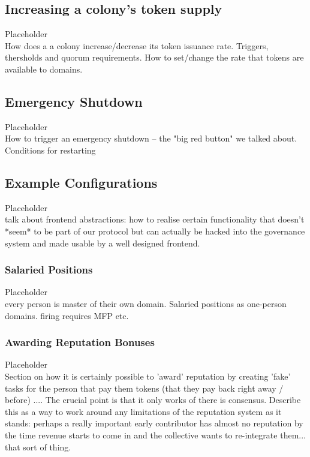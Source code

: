  
\subsection{Increasing a colony's token supply}\label{sec:colony-token-managements}

%
Placeholder\\
How does a a colony increase/decrease its token issuance rate. Triggers, thersholds and quorum requirements.
How to set/change the rate that tokens are available to domains.
%

\subsection{Emergency Shutdown}
%
Placeholder\\
How to trigger an emergency shutdown -- the "big red button" we talked about.
Conditions for restarting
%

\subsection{Example Configurations}\label{sec:example-configs}
%
Placeholder\\
talk about frontend abstractions: how to realise certain functionality that doesn't *seem* to be part of our protocol but can actually be hacked into the governance system and made usable by a well designed frontend.
%

\subsubsection{Salaried Positions}\label{sec:salary}
%
Placeholder\\
every person is master of their own domain. 
Salaried positions as one-person domains.
firing requires MFP etc.
%


\subsubsection{Awarding Reputation Bonuses}

%
Placeholder\\
Section on how it is certainly possible to 'award' reputation by creating 'fake' tasks for the person that pay them tokens (that they pay back right away / before) ....
The crucial point is that it only works of there is consensus.
Describe this as a way to work around any limitations of the reputation system as it stands: perhaps a really important early contributor has almost no reputation by the time revenue starts to come in and the collective wants to re-integrate them... that sort of thing.
%

